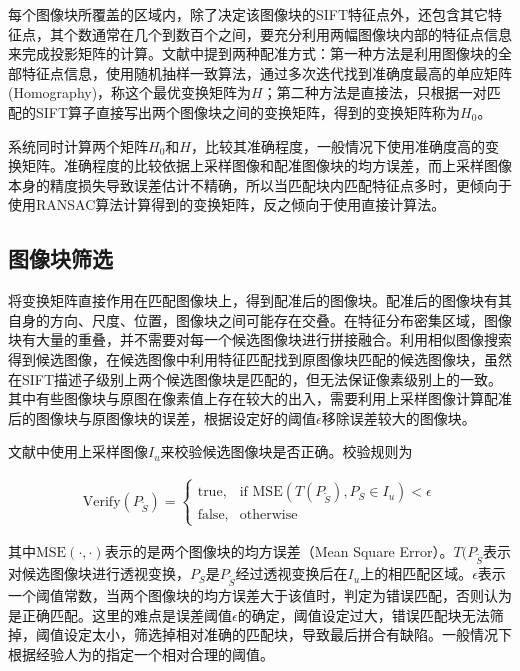 \documentclass[UTF8]{csoarticle}
\begin{document}
每个图像块所覆盖的区域内，除了决定该图像块的SIFT特征点外，还包含其它特征点，其个数通常在几个到数百个之间，要充分利用两幅图像块内部的特征点信息来完成投影矩阵的计算。文献\cite{Dai:2012vn}中提到两种配准方式：第一种方法是利用图像块的全部特征点信息，使用随机抽样一致算法，通过多次迭代找到准确度最高的单应矩阵(Homography)，称这个最优变换矩阵为\(H\)；第二种方法是直接法，只根据一对匹配的SIFT算子直接写出两个图像块之间的变换矩阵，得到的变换矩阵称为\(H_0\)。

系统同时计算两个矩阵\(H_0\)和\(H\)，比较其准确程度，一般情况下使用准确度高的变换矩阵。准确程度的比较依据上采样图像和配准图像块的均方误差，而上采样图像本身的精度损失导致误差估计不精确，所以当匹配块内匹配特征点多时，更倾向于使用RANSAC算法计算得到的变换矩阵，反之倾向于使用直接计算法。

\subsection{图像块筛选}
将变换矩阵直接作用在匹配图像块上，得到配准后的图像块。配准后的图像块有其自身的方向、尺度、位置，图像块之间可能存在交叠。在特征分布密集区域，图像块有大量的重叠，并不需要对每一个候选图像块进行拼接融合。利用相似图像搜索得到候选图像，在候选图像中利用特征匹配找到原图像块匹配的候选图像块，虽然在SIFT描述子级别上两个候选图像块是匹配的，但无法保证像素级别上的一致。其中有些图像块与原图在像素值上存在较大的出入，需要利用上采样图像计算配准后的图像块与原图像块的误差，根据设定好的阈值\(\epsilon\)移除误差较大的图像块。

文献\cite{Dai:2012vn}中使用上采样图像\(I_u\)来校验候选图像块是否正确。校验规则为

\begin{align}
\label{eq:errorControl}
  \text{Verify}(P_{\tilde{S}}) = 
\begin{cases} 
\text{true}, & \mbox{if MSE} (T(P_{\tilde{S}}),P_S \in I_u) < \epsilon \\
\text{false}, & \mbox{otherwise}
\end{cases}
\end{align}

其中\(\text{MSE}(\cdot,\cdot)\)表示的是两个图像块的均方误差（Mean Square Error）。\(T(P_{\tilde{S}}\)表示对候选图像块进行透视变换，\(P_{S}\)是\(P_{\tilde{S}}\)经过透视变换后在\(I_u\)上的相匹配区域。\(\epsilon\)表示一个阈值常数，当两个图像块的均方误差大于该值时，判定为错误匹配，否则认为是正确匹配。这里的难点是误差阈值\(\epsilon\)的确定，阈值设定过大，错误匹配块无法筛掉，阈值设定太小，筛选掉相对准确的匹配块，导致最后拼合有缺陷。一般情况下根据经验人为的指定一个相对合理的阈值。
\end{document}
